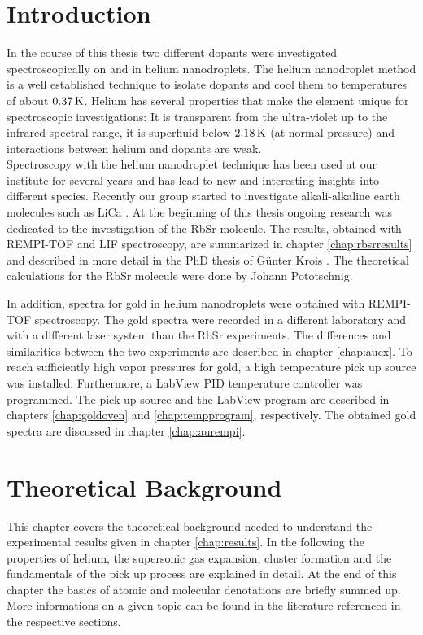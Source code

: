 \documentclass[parskip,12pt,headsepline,a4paper] {scrbook}
\begin{document}
\chapter{Introduction}
\setcounter{page}{1}
In the course of this thesis two different dopants were investigated spectroscopically on and in helium nanodroplets. The helium nanodroplet method is a well established technique to isolate dopants and cool them to temperatures of about $\unit[0.37]{K}$. Helium has several properties that make the element unique for spectroscopic investigations: It is transparent from the ultra-violet up to the infrared spectral range, it is superfluid below $\unit[2.18]{K}$ (at normal pressure) and interactions between helium and dopants are weak. \\
Spectroscopy with the helium nanodroplet technique has been used at our institute for several years and has lead to new and interesting insights into different species. %
Recently our group started to investigate alkali-alkaline earth molecules such as LiCa \cite{krois-lica}. At the beginning of this thesis ongoing research was dedicated to the investigation of the RbSr molecule. The results, obtained with REMPI-TOF and LIF spectroscopy, are summarized in chapter \ref{chap:rbsrresults} and described in more detail in the PhD thesis of G\"unter Krois \cite{krois-doc}. The theoretical calculations for the RbSr molecule were done by Johann Pototschnig.

In addition, spectra for gold in helium nanodroplets were obtained with REMPI-TOF spectroscopy. The gold spectra were recorded in a different laboratory and with a different laser system than the RbSr experiments. The differences and similarities between the two experiments are described in chapter \ref{chap:auex}. To reach sufficiently high vapor pressures for gold, a high temperature pick up source was installed. Furthermore, a LabView PID temperature controller was programmed. The pick up source and the LabView program are described in chapters \ref{chap:goldoven} and \ref{chap:tempprogram}, respectively. The obtained gold spectra are discussed in chapter \ref{chap:aurempi}.

\chapter{Theoretical Background}
This chapter covers the theoretical background needed to understand the experimental results given in chapter \ref{chap:results}. In the following the properties of helium, the supersonic gas expansion, cluster formation and the fundamentals of the pick up process are explained in detail. At the end of this chapter the basics of atomic and molecular denotations are briefly summed up.
More informations on a given topic can be found in the literature referenced in the respective sections.
\end{document}
